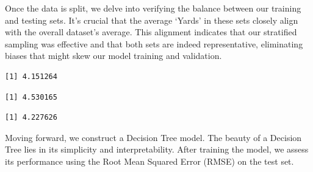 \documentclass[
  super,
  preprint,
  3p]{elsarticle}
\newenvironment{Shaded}{\begin{snugshade}}{\end{snugshade}}
\newcommand{\CommentTok}[1]{\textcolor[rgb]{0.37,0.37,0.37}{#1}}
\newcommand{\FunctionTok}[1]{\textcolor[rgb]{0.28,0.35,0.67}{#1}}
\newcommand{\NormalTok}[1]{\textcolor[rgb]{0.00,0.23,0.31}{#1}}
\newcommand{\OtherTok}[1]{\textcolor[rgb]{0.00,0.23,0.31}{#1}}
\newcommand{\SpecialCharTok}[1]{\textcolor[rgb]{0.37,0.37,0.37}{#1}}
\begin{document}
Once the data is split, we delve into verifying the balance between our
training and testing sets. It's crucial that the average `Yards' in
these sets closely align with the overall dataset's average. This
alignment indicates that our stratified sampling was effective and that
both sets are indeed representative, eliminating biases that might skew
our model training and validation.

\begin{Shaded}
\end{Shaded}

\begin{verbatim}
[1] 4.151264
\end{verbatim}

\begin{Shaded}
\end{Shaded}

\begin{verbatim}
[1] 4.530165
\end{verbatim}

\begin{Shaded}
\end{Shaded}

\begin{verbatim}
[1] 4.227626
\end{verbatim}

Moving forward, we construct a Decision Tree model. The beauty of a
Decision Tree lies in its simplicity and interpretability. After
training the model, we assess its performance using the Root Mean
Squared Error (RMSE) on the test set.
\end{document}
